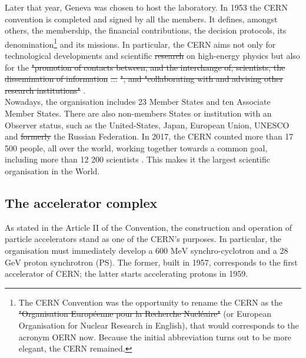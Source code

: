 \documentclass[ALICE,manyauthors]{cernphprep}
\newcommand {\unitStyle}[1] {\mbox{\ensuremath{\text{#1}}}}
\newcommand {\gev}      {\unitStyle{GeV}\xspace}
\newcommand {\mev}      {\unitStyle{MeV}\xspace}
\providecommand{\DIFaddtex}[1]{{\protect\color{blue}\uwave{#1}}} %
\providecommand{\DIFdeltex}[1]{{\protect\color{red}\sout{#1}}}                      %
\providecommand{\DIFaddbegin}{} %
\providecommand{\DIFaddend}{} %
\providecommand{\DIFdelbegin}{} %
\providecommand{\DIFdelend}{} %
\providecommand{\DIFadd}[1]{\texorpdfstring{\DIFaddtex{#1}}{#1}} %
\providecommand{\DIFdel}[1]{\texorpdfstring{\DIFdeltex{#1}}{}} %
\newcommand{\DIFscaledelfig}{0.5}
\newlength{\DIFdelgraphicswidth} %
\newlength{\DIFdelgraphicsheight} %
\newcommand{\DIFaddincludegraphics}[2][]{{\color{blue}\fbox{\DIFOincludegraphics[#1]{#2}}}} %
\newcommand{\DIFdelincludegraphics}[2][]{%
\sbox{\DIFdelgraphicsbox}{\DIFOincludegraphics[#1]{#2}}%
\settoboxwidth{\DIFdelgraphicswidth}{\DIFdelgraphicsbox} %
\settoboxtotalheight{\DIFdelgraphicsheight}{\DIFdelgraphicsbox} %
\scalebox{\DIFscaledelfig}{%
\parbox[b]{\DIFdelgraphicswidth}{\usebox{\DIFdelgraphicsbox}\\[-\baselineskip] \rule{\DIFdelgraphicswidth}{0em}}\llap{\resizebox{\DIFdelgraphicswidth}{\DIFdelgraphicsheight}{%
\setlength{\unitlength}{\DIFdelgraphicswidth}%
\begin{picture}(1,1)%
\thicklines\linethickness{2pt} %
{\color[rgb]{1,0,0}\put(0,0){\framebox(1,1){}}}%
{\color[rgb]{1,0,0}\put(0,0){\line( 1,1){1}}}%
{\color[rgb]{1,0,0}\put(0,1){\line(1,-1){1}}}%
\end{picture}%
}\hspace*{3pt}}} %
} %
\DeclareRobustCommand{\DIFaddbegin}{\DIFOaddbegin \let\includegraphics\DIFaddincludegraphics} %
\DeclareRobustCommand{\DIFaddend}{\DIFOaddend \let\includegraphics\DIFOincludegraphics} %
\DeclareRobustCommand{\DIFdelbegin}{\DIFOdelbegin \let\includegraphics\DIFdelincludegraphics} %
\DeclareRobustCommand{\DIFdelend}{\DIFOaddend \let\includegraphics\DIFOincludegraphics} %
\begin{document}
Later that year, Geneva was chosen to host the laboratory. In 1953 the CERN convention is completed and signed by all the members. It defines, amongst others, the membership, the financial contributions, the decision protocols, its denomination\footnote{The CERN Convention was the opportunity to rename the CERN as the \DIFdelbegin \DIFdel{"Organisation Européenne pour la Recherche Nucléaire" }\DIFdelend \DIFaddbegin {} \DIFaddend (or European Organisation for Nuclear Research in English), that would corresponds to the acronym OERN now. Because the initial abbreviation turns out to be more elegant, the \DIFaddbegin \DIFadd{name }\DIFaddend CERN remained.} and its missions. In particular, the CERN aims not only for technological developments and scientific \DIFdelbegin \DIFdel{research }\DIFdelend \DIFaddbegin \DIFadd{researches }\DIFaddend on high-energy physics but also for the \DIFdelbegin \DIFdel{"promotion of contacts between, and the interchange of, scientists, the dissemination of information }%
\DIFdel{...}%
\DIFdel{", and "collaborating with and advising other research institutions" }\DIFdelend \DIFaddbegin {}\DIFadd{, and } \DIFaddend \cite{cerncouncilConventionEstablishmentEuropean1953}.\\

Nowadays, the organisation includes 23 Member States and ten Associate Member States. There are also non-members States or institution with an Observer status, such as the United-States, Japan, European Union, UNESCO and \DIFdelbegin \DIFdel{formerly }\DIFdelend \DIFaddbegin \DIFadd{previously }\DIFaddend the Russian Federation. In 2017, the CERN counted more than 17 500 people, all over the world, working together towards a common goal, including more than 12 200 scientists \cite{cernOurPeople2023}. This makes it the largest scientific organisation in the World.

\subsection{The accelerator complex}
\label{subsec:AcceleratorComplex}

As stated in the Article II of the Convention, the construction and operation of particle accelerators stand as one of the CERN's purposes. In particular, the organisation must immediately develop a 600 \mev synchro-cyclotron and a 28 \gev proton synchrotron (PS). The former, built in 1957, corresponds to the first accelerator of CERN; the latter starts accelerating protons in 1959.
\end{document}
